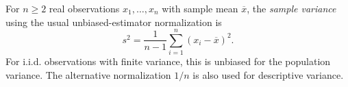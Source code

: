 
For $n\ge2$ real observations $x_1,\ldots,x_n$ with sample mean $\overline x$, the \emph{sample variance} using the usual unbiased-estimator normalization is
\[
s^2=\frac{1}{n-1}\sum_{i=1}^n(x_i-\overline x)^2.
\]
For i.i.d. observations with finite variance, this is unbiased for the population variance. The alternative normalization $1/n$ is also used for descriptive variance.
